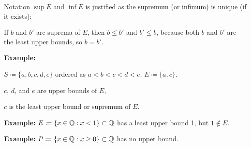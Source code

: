 \documentclass[10pt,aspectratio=169]{beamer}
\begin{document}
\begin{frame}
\qquad{}

\pause
\medskip

Notation $\sup E$ and $\inf E$ is justified as
the
supremum (or infimum) is unique (if it exists):

\pause
\medskip

If $b$ and
$b'$ are suprema of $E$, then $b \leq b'$ and $b' \leq b$, because both
$b$ and $b'$ are the least upper bounds, so $b=b'$.

\pause
\medskip

\textbf{Example:}

$S \coloneqq \{ a, b, c, d, e \}$ ordered as $a < b < c < d < e$.
\qquad
$E \coloneqq \{ a, c \}$.

\pause

$c$, $d$, and $e$ are upper bounds of $E$,

\pause

$c$ is the least upper bound or supremum of $E$.

\medskip
\pause

\textbf{Example:}
$E \coloneqq \{ x \in {\mathbb{Q}} : x < 1 \} \subset {\mathbb{Q}}$ has a least upper bound 1, but
$1 \notin E$.

\medskip
\pause

\textbf{Example:}
$P \coloneqq \{ x \in {\mathbb{Q}} : x \geq 0 \} \subset {\mathbb{Q}}$ has no upper bound.

\end{frame}
\end{document}
